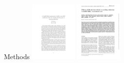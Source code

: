 \documentclass[aspectratio=169]{beamer}
\newcommand{\smallpaperwidth}{0.175}
\begin{document}
\begin{frame}{Methods}
{		\includegraphics[width=\smallpaperwidth\textwidth]{haustein01}
		\includegraphics[width=\smallpaperwidth\textwidth]{rennard06}
}
\end{frame}
\end{document}
